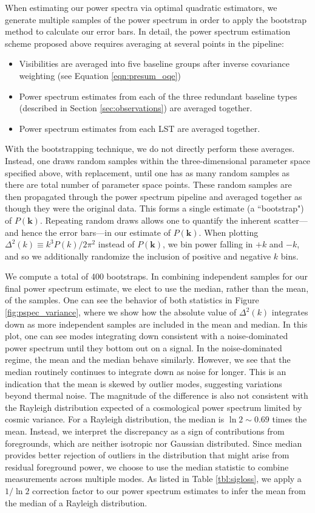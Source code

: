 \documentclass[twocolumn,numberedappendix]{emulateapj} \shorttitle{New Limits on the 21 cm Power Spectrum at $z=8.4$}
\begin{document}
When estimating our power spectra via optimal quadratic estimators, we generate
multiple samples of the power spectrum in order to apply the bootstrap method to
calculate our error bars. In detail, the power spectrum estimation scheme proposed
above requires averaging at several points in the pipeline:
\begin{itemize}
\item Visibilities are averaged into five baseline groups after inverse covariance weighting (see Equation \eqref{eqn:presum_oqe})
\item Power spectrum estimates from each of the three redundant baseline types (described in Section \ref{sec:observations}) are averaged together.
\item Power spectrum estimates from each LST are averaged together.
\end{itemize}
With the bootstrapping technique, we do not directly perform these averages. Instead,
one draws random samples within the three-dimensional parameter space specified above,
with replacement, until one has as many random samples as there are total number of parameter
space points. These random samples are then propagated through the power spectrum pipeline
and averaged together as though they were the original data. This forms a single estimate (a ``bootstrap") of $P(\mathbf{k})$. Repeating 
random draws allows one to quantify the inherent scatter---and hence the error bars---in our
estimate of $P(\mathbf{k})$. When plotting $\Delta^2 (k) \equiv k^3 P(k) / 2 \pi^2$ instead of
$P(\mathbf{k})$, we bin power falling in $+k$ and $-k$, and so 
we additionally randomize the inclusion of 
positive and negative $k$ bins.

We compute a total of 400 bootstraps. In combining independent samples for our final power spectrum
estimate, we elect to use the median, rather than the mean, of the samples. One can see the behavior 
of both statistics in Figure \ref{fig:pspec_variance}, where we
show how the absolute value of $\Delta^2(k)$ integrates down as more independent samples are included in the mean and median.
In this plot, one can see modes integrating down 
consistent with a noise-dominated power spectrum until they bottom out on a signal.
In the noise-dominated regime, the mean and the median
behave similarly.  However, we see that the median routinely continues to integrate down as noise for longer.
This is an indication that the mean is skewed by outlier modes, suggesting variations beyond thermal noise. The magnitude of the difference
is also not consistent with the Rayleigh distribution expected of a cosmological power spectrum limited by cosmic
variance.  
For a Rayleigh distribution, the median is $\ln2 \sim 0.69$ times the mean. 
Instead, we interpret the discrepancy as a sign of contributions from foregrounds, which are neither isotropic 
nor Gaussian distributed.  Since median provides 
better rejection of outliers in the distribution that might arise from residual foreground power, we choose to use
the median statistic to combine measurements across multiple modes.
As listed in Table \ref{tbl:sigloss}, we apply a $1/\ln2$ correction factor to our power spectrum estimates to 
infer the mean from the median of a Rayleigh distribution.
\end{document}
